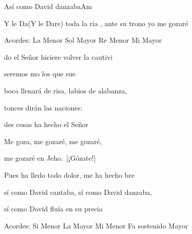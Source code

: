\documentclass[12pt, spanish]{book}
\begin{document}
\begin{song}{Así como David danzaba}{Am}
\begin{SBOpGroup}
            Y le Da(Y le Dare)  toda la ria , ante su trono yo me gozaré
        \end{SBOpGroup}

        \ifChordBk
        \begin{SBOpGroup}
            Acordes:\break
            \upchord{\Am}\qquad La Menor \hfill
            \upchord{\G}\qquad Sol Mayor \hfill\null\break
            \upchord{\Dm}\qquad Re Menor \hfill
            \upchord{\E}\qquad Mi Mayor \hfill\null\break
        \end{SBOpGroup}
        \fi

        \begin{SBExtraKeys}{

            \begin{SBOpGroup}
                do el Señor hiciere volver la cautivi

                seremos mo los que sue
            \end{SBOpGroup}
            \vskip 20pt
            \begin{SBOpGroup}

                 boca llenará de risa,  labios de alabanza,

                tonces dirán las naciones:

                des cosas ha hecho el Señor
            \end{SBOpGroup}

            \vskip 20pt
            \begin{SBOpGroup}
                Me goza, me gozaré, me gozaré,

                me gozaré en Jeho.~[¡Gózate!]

                Pues ha lledo todo dolor, me ha hecho bre
            \end{SBOpGroup}

            \begin{SBChorus}
                sí como David cantaba, sí como David danzaba,

                sí como David fluía en su precia
            \end{SBChorus}
            \ifChordBk
            \begin{SBOpGroup}
                Acordes:\break
                \upchord{\Bm}\qquad Si Menor \hfill
                \upchord{\A}\qquad La Mayor \hfill\null\break
                \upchord{\Em}\qquad Mi Menor \hfill
                \upchord{\Fs}\qquad Fa sostenido Mayor \hfill\null\break
            \end{SBOpGroup}
            \fi
        }\end{SBExtraKeys}
    \end{song}
\end{document}

